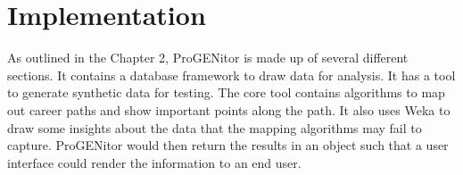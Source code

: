 \chapter{Implementation}
\label{chap:implementation}
As outlined in the Chapter 2, ProGENitor is made up of several
different sections.  It contains a database framework to draw data for
analysis.  It has a tool to generate synthetic data for testing.  The core tool
contains algorithms to map out career paths and show important points along the
path.  It also uses Weka to draw some insights about the data that the mapping
algorithms may fail to capture.  ProGENitor would then return the results in an
object such that a user interface could render the information to an end user.







